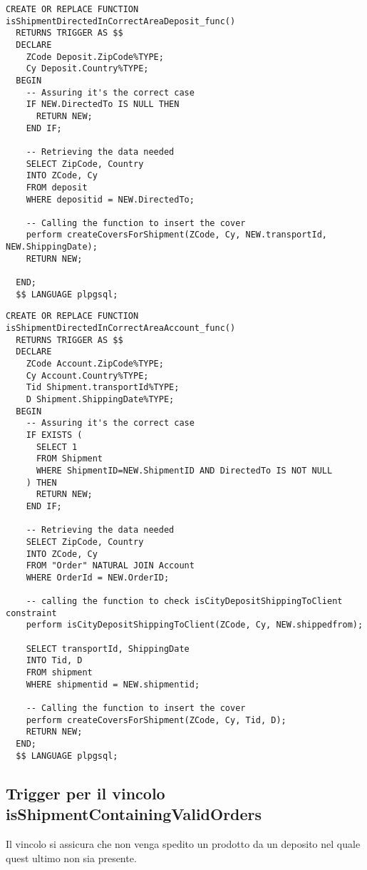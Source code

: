 \begin{lstlisting}[caption={Funzione per le spedizioni verso depositi}]
  CREATE OR REPLACE FUNCTION isShipmentDirectedInCorrectAreaDeposit_func() 
  RETURNS TRIGGER AS $$
  DECLARE 
    ZCode Deposit.ZipCode%TYPE;
    Cy Deposit.Country%TYPE;
  BEGIN 
    -- Assuring it's the correct case
    IF NEW.DirectedTo IS NULL THEN 
      RETURN NEW;
    END IF;

    -- Retrieving the data needed
    SELECT ZipCode, Country 
    INTO ZCode, Cy
    FROM deposit
    WHERE depositid = NEW.DirectedTo;

    -- Calling the function to insert the cover
    perform createCoversForShipment(ZCode, Cy, NEW.transportId, NEW.ShippingDate);
    RETURN NEW;

  END;
  $$ LANGUAGE plpgsql;
\end{lstlisting}

\begin{lstlisting}[caption={Funzione per le spedizioni verso clienti}]
  CREATE OR REPLACE FUNCTION isShipmentDirectedInCorrectAreaAccount_func() 
  RETURNS TRIGGER AS $$
  DECLARE 
    ZCode Account.ZipCode%TYPE;
    Cy Account.Country%TYPE;
    Tid Shipment.transportId%TYPE;
    D Shipment.ShippingDate%TYPE;
  BEGIN 
    -- Assuring it's the correct case
    IF EXISTS (
      SELECT 1
      FROM Shipment
      WHERE ShipmentID=NEW.ShipmentID AND DirectedTo IS NOT NULL
    ) THEN
      RETURN NEW;
    END IF;
  
    -- Retrieving the data needed
    SELECT ZipCode, Country 
    INTO ZCode, Cy
    FROM "Order" NATURAL JOIN Account
    WHERE OrderId = NEW.OrderID;

    -- calling the function to check isCityDepositShippingToClient constraint
    perform isCityDepositShippingToClient(ZCode, Cy, NEW.shippedfrom);
  
    SELECT transportId, ShippingDate
    INTO Tid, D
    FROM shipment
    WHERE shipmentid = NEW.shipmentid;
  
    -- Calling the function to insert the cover
    perform createCoversForShipment(ZCode, Cy, Tid, D);
    RETURN NEW;
  END;
  $$ LANGUAGE plpgsql;
\end{lstlisting}

\subsection{Trigger per il vincolo \textbf{isShipmentContainingValidOrders}}

Il vincolo si assicura che non venga spedito un prodotto da un deposito nel quale quest ultimo non sia presente.

